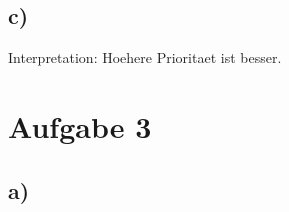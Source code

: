 \documentclass[a4paper,11pt,parskip=half]{scrartcl}
\begin{document}
\subsection*{c)}

Interpretation: Hoehere Prioritaet ist besser.

\begin{blockgraph}{20}{4}{0.7}



\end{blockgraph}

\section*{Aufgabe 3}

\subsection*{a)}
\begin{blockgraph}{40}{1}{0.4}
    
\end{blockgraph}
\end{document}
